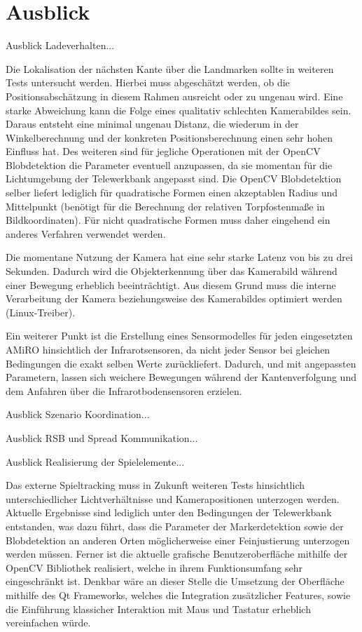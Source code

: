\chapter{Ausblick} \label{kap:ausblick}

Ausblick Ladeverhalten...

Die Lokalisation der nächsten Kante über die Landmarken sollte in weiteren Tests untersucht werden. Hierbei muss abgeschätzt werden, ob die Positionsabschätzung in diesem Rahmen ausreicht oder zu ungenau wird. Eine starke Abweichung kann die Folge eines qualitativ schlechten Kamerabildes sein. Daraus entsteht eine minimal ungenau Distanz, die wiederum in der Winkelberechnung und der konkreten Positionsberechnung einen sehr hohen Einfluss hat. Des weiteren sind für jegliche Operationen mit der OpenCV Blobdetektion die Parameter eventuell anzupassen, da sie momentan für die Lichtumgebung der Telewerkbank angepasst sind. Die OpenCV Blobdetektion selber liefert lediglich für quadratische Formen einen akzeptablen Radius und Mittelpunkt (benötigt für die Berechnung der relativen Torpfostenmaße in Bildkoordinaten). Für nicht quadratische Formen muss daher eingehend ein anderes Verfahren verwendet werden.

Die momentane Nutzung der Kamera hat eine sehr starke Latenz von bis zu drei Sekunden. Dadurch wird die Objekterkennung über das Kamerabild während einer Bewegung erheblich beeinträchtigt. Aus diesem Grund muss die interne Verarbeitung der Kamera beziehungsweise des Kamerabildes optimiert werden (Linux-Treiber). 

Ein weiterer Punkt ist die Erstellung eines Sensormodelles für jeden eingesetzten AMiRO hinsichtlich der Infrarotsensoren, da nicht jeder Sensor bei gleichen Bedingungen die exakt selben Werte zurückliefert. Dadurch, und mit angepassten Parametern, lassen sich weichere Bewegungen während der Kantenverfolgung und dem Anfahren über die Infrarotbodensensoren erzielen.

Ausblick Szenario Koordination...

Ausblick RSB und Spread Kommunikation...

Ausblick Realisierung der Spielelemente...

Das externe Spieltracking muss in Zukunft weiteren Tests hinsichtlich unterschiedlicher Lichtverhältnisse und Kamerapositionen unterzogen werden. Aktuelle Ergebnisse sind lediglich unter den Bedingungen der Telewerkbank entstanden, was dazu führt, dass die Parameter der Markerdetektion sowie der Blobdetektion an anderen Orten möglicherweise einer Feinjustierung unterzogen werden müssen.
Ferner ist die aktuelle grafische Benutzeroberfläche mithilfe der OpenCV Bibliothek realisiert, welche in ihrem Funktionsumfang sehr eingeschränkt ist. Denkbar wäre an dieser Stelle die Umsetzung der Oberfläche mithilfe des Qt Frameworks, welches die Integration zusätzlicher Features, sowie die Einführung klassicher Interaktion mit Maus und Tastatur erheblich vereinfachen würde.